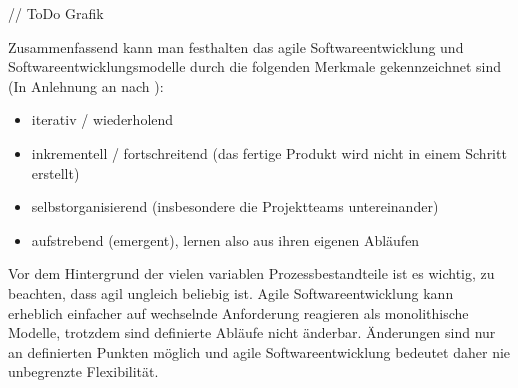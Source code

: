 // ToDo Grafik

Zusammenfassend kann man festhalten das agile Softwareentwicklung und Softwareentwicklungsmodelle durch die folgenden Merkmale gekennzeichnet sind (In Anlehnung an \cite{moniruzzaman2013comparative} nach \cite{goos_extreme_2002}):
\begin{itemize}
    \item iterativ / wiederholend
    \item inkrementell / fortschreitend (das fertige Produkt wird nicht in einem Schritt erstellt)
    \item selbstorganisierend (insbesondere die Projektteams untereinander)
    \item aufstrebend (\glqq{}emergent\grqq{}), lernen also aus ihren eigenen Abläufen
\end{itemize}
Vor dem Hintergrund der vielen variablen Prozessbestandteile ist es wichtig, zu beachten, dass agil ungleich beliebig ist.
Agile Softwareentwicklung kann erheblich einfacher auf wechselnde Anforderung reagieren als monolithische Modelle, trotzdem sind definierte Abläufe nicht änderbar. Änderungen sind nur an definierten Punkten möglich und agile Softwareentwicklung bedeutet daher nie unbegrenzte Flexibilität. 